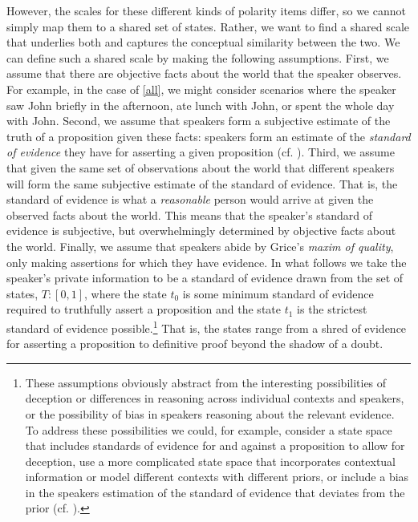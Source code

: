 \documentclass[linguex]{sp}
\theoremstyle{definition} \newtheorem{definition}{Definition}
\begin{document}
However, the scales for these different kinds of polarity items differ, so we cannot simply map them to a shared set of states. Rather, we want to find a shared scale that underlies both and captures the conceptual similarity between the two. We can define such a shared scale by making the following assumptions. First, we assume that there are objective facts about the world that the speaker observes. For example, in the case of \ref{all}, we might consider scenarios where the speaker saw John briefly in the afternoon, ate lunch with John, or spent the whole day with John. Second, we assume that speakers form a subjective estimate of the truth of a proposition given these facts: speakers form an estimate of the \emph{standard of evidence} they have for asserting a given proposition (cf. \citealt{lewis1970,krifka1995polarity}). Third, we assume that given the same set of observations about the world that different speakers will form the same subjective estimate of the standard of evidence. That is,  the standard of evidence is what a \emph{reasonable} person would arrive at given the observed facts about the world. This means that the speaker's standard of evidence is subjective, but overwhelmingly determined by objective facts about the world. Finally, we assume that speakers abide by Grice's \citeyearpar{grice1975} \emph{maxim of quality}, only making assertions for which they have evidence.  In what follows we take the speaker's private information to be a standard of evidence drawn from the set of states, $T : [0,1]$, where the state  $t_0$ is some minimum standard of evidence required to truthfully assert a proposition and the state  $t_1$ is the strictest standard of evidence possible.\footnote{These assumptions obviously abstract from the interesting possibilities of deception or differences in reasoning across individual contexts and speakers, or the possibility of bias in speakers reasoning about the relevant evidence. To address these possibilities we could, for example, consider a state space that includes standards of evidence for and against a proposition to allow for deception, use a more complicated state space that incorporates contextual information or model different contexts with different priors, or include a bias in the speakers estimation of the standard of evidence that deviates from the prior  (cf. \citealt{schaden2012}).} That is, the states range from a shred of evidence for asserting a proposition to definitive proof beyond the shadow of a doubt.
\end{document}
